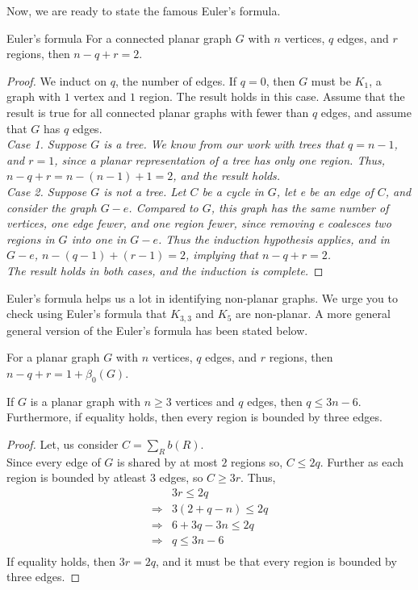 \documentclass[../basic_graph_theory.tex]{subfiles}
\begin{document}
Now, we are ready to state the famous Euler's formula.
\begin{Thm}{Euler's formula}{}
    For a connected planar graph $G$ with $n$ vertices, $q$ edges, and $r$ regions, then $n-q+r=2$.
\end{Thm}
\begin{proof}
    We induct on $q$, the number of edges. If $q = 0$, then $G$ must be $K_1$, a graph with $1$ vertex and $1$ region. The result holds in this case. Assume that the result is true for all connected planar graphs with fewer than $q$ edges, and assume that $G$ has $q$ edges.\\
    \em{Case 1.} Suppose $G$ is a tree. We know from our work with trees that $q = n-1$, and $r = 1$, since a planar representation of a tree has only one region. Thus, $n - q + r = n - (n - 1) + 1 = 2$, and the result holds.\\
    \em{Case 2.} Suppose $G$ is not a tree. Let $C$ be a cycle in $G$, let e be an edge of $C$, and consider the graph $G - e$. Compared to $G$, this graph has the same number of vertices, one edge fewer, and one region fewer, since removing e coalesces two regions in $G$ into one in $G - e$. Thus the induction hypothesis applies, and in $G - e$, $n - (q - 1) + (r - 1) = 2$, implying that $n - q + r = 2$.\\
    The result holds in both cases, and the induction is complete.
\end{proof}

Euler's formula helps us a lot in identifying non-planar graphs. We urge you to check using Euler's formula that $K_{3,3}$ and $K_5$ are non-planar. A more general general version of the Euler's formula has been stated below.

\begin{Thm}{}{}
    For a planar graph $G$ with $n$ vertices, $q$ edges, and $r$ regions, then $n-q+r=1+\beta_{0}(G)$.
\end{Thm}

\begin{Thm}{}{}
    If $G$ is a planar graph with $n \ge 3$ vertices and $q$ edges, then $q \le 3n - 6$. Furthermore, if equality holds, then every region is bounded by three edges.
\end{Thm}
\begin{proof}
    Let, us consider $C=\sum_{R}b(R)$.\\
    Since every edge of $G$ is shared by at most $2$ regions so, $C \le 2q$. Further as each region is bounded by atleast $3$ edges, so $C \ge 3r$. Thus,\\
    \begin{align*}
                        & 3r \le 2q       \\
        \Longrightarrow & 3(2+q-n) \le 2q \\
        \Longrightarrow & 6+3q-3n \le 2q  \\
        \Longrightarrow & q \le 3n-6      \\
    \end{align*}
    If equality holds, then $3r = 2q$, and it must be that every region is bounded by three edges.
\end{proof}
\end{document}
